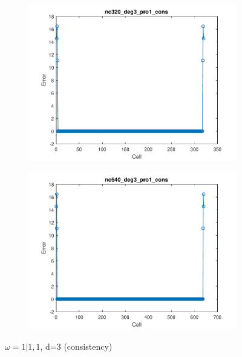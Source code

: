\documentclass[11pt,a4paper]{article}
\theoremstyle{plain}
\theoremstyle{definition}
\begin{document}
\begin{figure}[H]
\medskip
\begin{subfigure}[b]{0.48\textwidth}
\includegraphics[width=\linewidth]{../../tests_01_01/test_01_01_test9_pro1_cons/output/plots/nc320_deg3_wei111_pro1_cons.pdf}
\end{subfigure}\hspace*{\fill}
\begin{subfigure}[b]{0.48\textwidth}
\includegraphics[width=\linewidth]{../../tests_01_01/test_01_01_test9_pro1_cons/output/plots/nc640_deg3_wei111_pro1_cons.pdf}
\end{subfigure}

\caption{$\omega=1|1,1$, d=3 (consistency)}
\end{figure}
\end{document}
